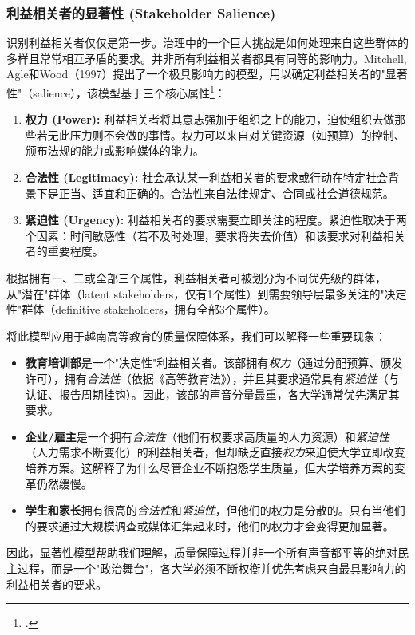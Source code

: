 \subsubsection{利益相关者的显著性 (Stakeholder Salience)}

识别利益相关者仅仅是第一步。治理中的一个巨大挑战是如何处理来自这些群体的多样且常常相互矛盾的要求。并非所有利益相关者都具有同等的影响力。Mitchell, Agle和Wood（1997）提出了一个极具影响力的模型，用以确定利益相关者的"显著性"（salience），该模型基于三个核心属性\footcite{Mitchell1997}：

\begin{enumerate}
    \item \textbf{权力 (Power):} 利益相关者将其意志强加于组织之上的能力，迫使组织去做那些若无此压力则不会做的事情。权力可以来自对关键资源（如预算）的控制、颁布法规的能力或影响媒体的能力。
    \item \textbf{合法性 (Legitimacy):} 社会承认某一利益相关者的要求或行动在特定社会背景下是正当、适宜和正确的。合法性来自法律规定、合同或社会道德规范。
    \item \textbf{紧迫性 (Urgency):} 利益相关者的要求需要立即关注的程度。紧迫性取决于两个因素：时间敏感性（若不及时处理，要求将失去价值）和该要求对利益相关者的重要程度。
\end{enumerate}

根据拥有一、二或全部三个属性，利益相关者可被划分为不同优先级的群体，从"潜在"群体（latent stakeholders，仅有1个属性）到需要领导层最多关注的"决定性"群体（definitive stakeholders，拥有全部3个属性）。

将此模型应用于越南高等教育的质量保障体系，我们可以解释一些重要现象：
\begin{itemize}
    \item \textbf{教育培训部}是一个"决定性"利益相关者。该部拥有\textit{权力}（通过分配预算、颁发许可），拥有\textit{合法性}（依据《高等教育法》），并且其要求通常具有\textit{紧迫性}（与认证、报告周期挂钩）。因此，该部的声音分量最重，各大学通常优先满足其要求。
    \item \textbf{企业/雇主}是一个拥有\textit{合法性}（他们有权要求高质量的人力资源）和\textit{紧迫性}（人力需求不断变化）的利益相关者，但却缺乏直接\textit{权力}来迫使大学立即改变培养方案。这解释了为什么尽管企业不断抱怨学生质量，但大学培养方案的变革仍然缓慢。
    \item \textbf{学生和家长}拥有很高的\textit{合法性}和\textit{紧迫性}，但他们的权力是分散的。只有当他们的要求通过大规模调查或媒体汇集起来时，他们的权力才会变得更加显著。
\end{itemize}
因此，显著性模型帮助我们理解，质量保障过程并非一个所有声音都平等的绝对民主过程，而是一个"政治舞台"，各大学必须不断权衡并优先考虑来自最具影响力的利益相关者的要求。

